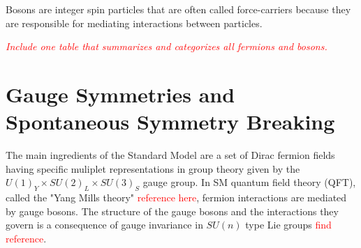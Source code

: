 Bosons are integer spin particles that are often called force-carriers because they are responsible for mediating interactions between particles. 

\textcolor{red}{\textit{Include one table that summarizes and categorizes all fermions and bosons.}}


\iffalse
\section{Mathematical Formalism of the Standard Model}
\label{sec:math}
Field equations and fermion and boson interactions.

A major push in particle physics in the twentieth century was to describe the strong and weak nuclear forces by renormalized quantum fields.  The related field quanta for the strong force are the eight massless gluons, and for the weak force we have the $W^\pm$ and the $Z^0$ bosons.  The interactions of these force carriers with particles carrying the corresponding color and isospin charge describe by field theories. 

Group theory plays an important role in describing the forces and interactions of fundamental particles.  It provides a mathematical structure that exploits the underlying symmetries behind the fundamental forces.  The structure of the quark combinations that give rise to a slew of mesons and baryons is given by the $SU(3)_{color}$ symmetry.  It contains the $SU(2)$ isospin symmetry, where sets of quark combinations either form SU(2) doublets or triplets. \textit{singlets?}. Group theory is also used to describe the unification of the electromagnetic and weak interactions to form the electroweak theory of the Standard Model. 

Feynman diagrams provide a visual representing the matrix calculations of particle interactions.  Feynman rules make up the mathematical expression relating to each element of a Feynman diagram derived by quantum field theory.  \textcolor{red}{\textit{Give example?}}
\fi
\section{Gauge Symmetries and Spontaneous Symmetry Breaking}
\label{sec:gauge}
The main ingredients of the Standard Model are a set of Dirac fermion fields having specific muliplet representations in group theory given by the $U(1)_{Y} \times SU(2)_{L} \times SU(3)_{S}$ gauge group.  In SM quantum field theory (QFT), called the "Yang Mills theory" \textcolor{red}{reference here}, fermion interactions are mediated by gauge bosons.  The structure of the gauge bosons and the interactions they govern is a consequence of gauge invariance in $SU(n)$ type Lie groups \textcolor{red}{find reference}.  

